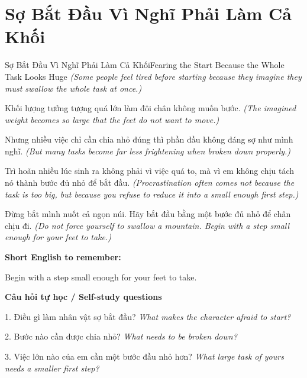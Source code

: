 \section{Sợ Bắt Đầu Vì Nghĩ Phải Làm Cả Khối}
\begin{truyen}{Sợ Bắt Đầu Vì Nghĩ Phải Làm Cả Khối}{Fearing the Start Because the Whole Task Looks Huge}
\textit{(Some people feel tired before starting because they imagine they must swallow the whole task at once.)}

Khối lượng tưởng tượng quá lớn làm đôi chân không muốn bước.
\textit{(The imagined weight becomes so large that the feet do not want to move.)}

Nhưng nhiều việc chỉ cần chia nhỏ đúng thì phần đầu không đáng sợ như mình nghĩ.
\textit{(But many tasks become far less frightening when broken down properly.)}

Trì hoãn nhiều lúc sinh ra không phải vì việc quá to, mà vì em không chịu tách nó thành bước đủ nhỏ để bắt đầu.
\textit{(Procrastination often comes not because the task is too big, but because you refuse to reduce it into a small enough first step.)}

\end{truyen}

\begin{baihoc}
Đừng bắt mình nuốt cả ngọn núi. Hãy bắt đầu bằng một bước đủ nhỏ để chân chịu đi.
\textit{(Do not force yourself to swallow a mountain. Begin with a step small enough for your feet to take.)}
\end{baihoc}

\begin{ghinhoanh}
\textbf{Short English to remember:}

Begin with a step small enough for your feet to take.

\end{ghinhoanh}

\begin{tuhocnhanh}
\textbf{Câu hỏi tự học / Self-study questions}

1. Điều gì làm nhân vật sợ bắt đầu? \textit{What makes the character afraid to start?}

2. Bước nào cần được chia nhỏ? \textit{What needs to be broken down?}

3. Việc lớn nào của em cần một bước đầu nhỏ hơn? \textit{What large task of yours needs a smaller first step?}
\end{tuhocnhanh}
\ngancach

